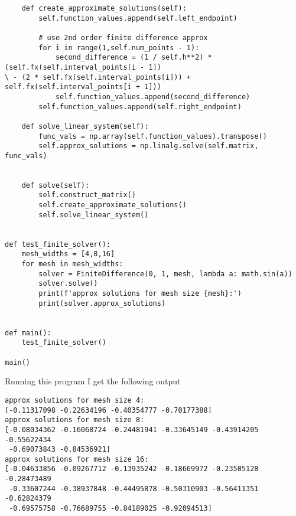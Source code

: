 \documentclass[10pt]{article}
\begin{document}
\begin{verbatim}
    def create_approximate_solutions(self):
        self.function_values.append(self.left_endpoint)

        # use 2nd order finite difference approx 
        for i in range(1,self.num_points - 1):
            second_difference = (1 / self.h**2) * (self.fx(self.interval_points[i - 1])
\ - (2 * self.fx(self.interval_points[i])) + self.fx(self.interval_points[i + 1]))
            self.function_values.append(second_difference)
        self.function_values.append(self.right_endpoint)
   
    def solve_linear_system(self):
        func_vals = np.array(self.function_values).transpose()
        self.approx_solutions = np.linalg.solve(self.matrix, func_vals)


    def solve(self):
        self.construct_matrix()
        self.create_approximate_solutions()
        self.solve_linear_system()


def test_finite_solver():
    mesh_widths = [4,8,16]
    for mesh in mesh_widths:
        solver = FiniteDifference(0, 1, mesh, lambda a: math.sin(a))
        solver.solve()
        print(f'approx solutions for mesh size {mesh}:')
        print(solver.approx_solutions)


def main(): 
    test_finite_solver()

main()
\end{verbatim}

Running this program I get the following output

\begin{verbatim}
approx solutions for mesh size 4:
[-0.11317098 -0.22634196 -0.40354777 -0.70177388]
approx solutions for mesh size 8:
[-0.08034362 -0.16068724 -0.24481941 -0.33645149 -0.43914205 -0.55622434
 -0.69073843 -0.84536921]
approx solutions for mesh size 16:
[-0.04633856 -0.09267712 -0.13935242 -0.18669972 -0.23505128 -0.28473489
 -0.33607244 -0.38937848 -0.44495878 -0.50310903 -0.56411351 -0.62824379
 -0.69575758 -0.76689755 -0.84189025 -0.92094513]
\end{verbatim}
\endgroup
\noindent \underline{\hspace{3in}}\\
\end{document}
